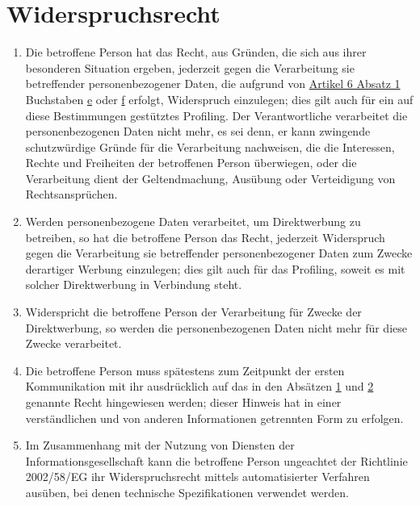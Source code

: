 \chapter{Widerspruchsrecht}
\label{ch:21}


\begin{enumerate}

  \item Die betroffene Person hat das Recht, aus Gründen, die sich aus ihrer besonderen Situation ergeben, jederzeit
   gegen die Verarbeitung sie betreffender personenbezogener Daten, die aufgrund von \hyperref[itm:06-1]{Artikel 6
   Absatz 1} Buchstaben \hyperref[itm:06-1e]{e} oder \hyperref[itm:06-1f]{f} erfolgt, Widerspruch einzulegen; dies gilt
   auch für ein auf diese Bestimmungen gestütztes Profiling. Der Verantwortliche verarbeitet die personenbezogenen
   Daten nicht mehr, es sei denn, er kann zwingende schutzwürdige Gründe für die Verarbeitung nachweisen, die die
   Interessen, Rechte und Freiheiten der betroffenen Person überwiegen, oder die Verarbeitung dient der Geltendmachung,
   Ausübung oder Verteidigung von Rechtsansprüchen.
  \label{itm:21-1}

  \item Werden personenbezogene Daten verarbeitet, um Direktwerbung zu betreiben, so hat die betroffene Person das
   Recht, jederzeit Widerspruch gegen die Verarbeitung sie betreffender personenbezogener Daten zum Zwecke derartiger
   Werbung einzulegen; dies gilt auch für das Profiling, soweit es mit solcher Direktwerbung in Verbindung steht.
  \label{itm:21-2}

  \item Widerspricht die betroffene Person der Verarbeitung für Zwecke der Direktwerbung, so werden die
   personenbezogenen Daten nicht mehr für diese Zwecke verarbeitet.
  \label{itm:21-3}

  \item Die betroffene Person muss spätestens zum Zeitpunkt der ersten Kommunikation mit ihr ausdrücklich auf das in den
   Absätzen \hyperref[itm:21-1]{1} und \hyperref[itm:21-2]{2} genannte Recht hingewiesen werden; dieser Hinweis hat in
   einer verständlichen und von anderen Informationen getrennten Form zu erfolgen.
  \label{itm:21-4}

  \item Im Zusammenhang mit der Nutzung von Diensten der Informationsgesellschaft kann die betroffene Person ungeachtet
   der Richtlinie 2002/58/EG ihr Widerspruchsrecht mittels automatisierter Verfahren ausüben, bei denen technische
   Spezifikationen verwendet werden.
  \label{itm:21-5}


\end{enumerate}
